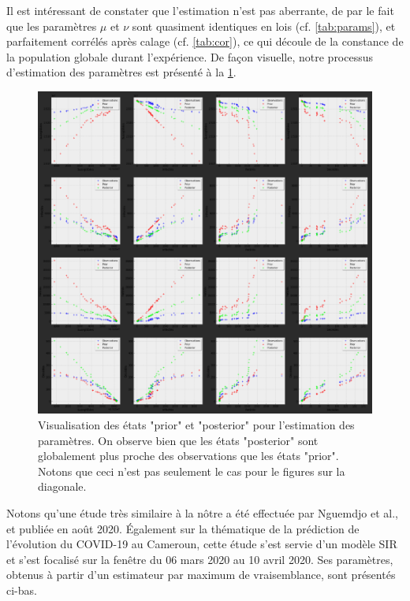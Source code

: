 \documentclass[
  french,
	10pt, %
]{fphw}
\begin{document}
\noindent Il est intéressant de constater que l'estimation n'est pas aberrante, de par le fait que les paramètres $\mu$ et $\nu$ sont quasiment identiques en lois (cf. \cref{tab:params}), et parfaitement corrélés après calage (cf. \cref{tab:cor}), ce qui découle de la constance de la population globale durant l'expérience. De façon visuelle, notre processus d'estimation des paramètres est présenté à la \cref{fig:priorpost}.

\begin{figure}[h]
  \centering
  \includegraphics[width=\linewidth]{priorpost.png}
  \caption{Visualisation des états "prior" et "posterior" pour l'estimation des paramètres. On observe bien que les états "posterior" sont globalement plus proche des observations que les états "prior". Notons que ceci n'est pas seulement le cas pour le figures sur la diagonale.}
  \label{fig:priorpost}
\end{figure}

\vspace*{0.6cm}

Notons qu'une étude très similaire à la nôtre a été effectuée par Nguemdjo et al., et publiée en août 2020. Également sur la thématique de la prédiction de l'évolution du COVID-19 au Cameroun, cette étude s'est servie d'un modèle SIR et s'est focalisé sur la fenêtre du 06 mars 2020 au 10 avril 2020. Ses paramètres, obtenus à partir d'un estimateur par maximum de vraisemblance, sont présentés ci-bas.   
\end{document}
